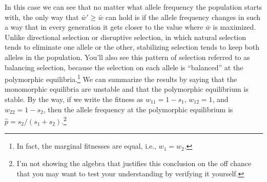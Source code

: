 In this case we can see that no matter what allele frequency the
population starts with, the only way that $\bar w' \ge \bar w$ can
hold is if the allele frequency changes in such a way that in every
generation it gets closer to the value where $\bar w$ is
maximized. Unlike directional selection or disruptive selection, in
which natural selection tends to eliminate one allele or the other,
stabilizing selection tends to keep both alleles in the
population. You'll also see this pattern of selection referred to as
balancing selection, because the selection on each allele is
``balanced'' at the polymorphic equilibria.\footnote{In fact, the
  marginal fitnesses are equal, i.e., $w_1=w_2$.} We can summarize the
results by saying that the monomorphic equilibria are unstable and
that the polymorphic equilibrium is stable. By the way, if we write
the fitness as $w_{11} = 1 - s_1$, $w_{12}=1$, and $w_{22}=1-s_2$,
then the allele frequency at the polymorphic equilibrium is
$\hat p=s_2/(s_1+s_2)$.\footnote{I'm not showing the algebra that
  justifies this conclusion on the off chance that you may want to
  test your understanding by verifying it yourself.}
